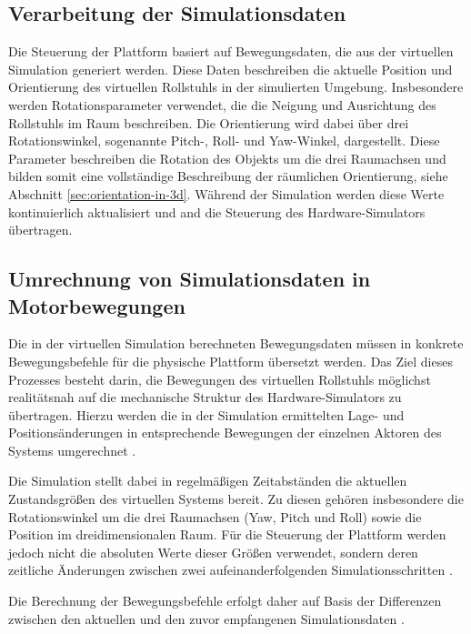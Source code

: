 \subsection{Verarbeitung der Simulationsdaten}
Die Steuerung der Plattform basiert auf Bewegungsdaten, die aus der virtuellen Simulation generiert werden. Diese Daten beschreiben die aktuelle Position und Orientierung des virtuellen Rollstuhls in der simulierten Umgebung. Insbesondere werden Rotationsparameter verwendet, die die Neigung und Ausrichtung des Rollstuhls im Raum beschreiben. Die Orientierung wird dabei über drei Rotationswinkel, sogenannte Pitch-, Roll- und Yaw-Winkel, dargestellt. Diese Parameter beschreiben die Rotation des Objekts um die drei Raumachsen und bilden somit eine vollständige Beschreibung der räumlichen Orientierung, siehe Abschnitt \ref{sec:orientation-in-3d}.
Während der Simulation werden diese Werte kontinuierlich aktualisiert und and die Steuerung des Hardware-Simulators übertragen.

\subsection{Umrechnung von Simulationsdaten in Motorbewegungen}
Die in der virtuellen Simulation berechneten Bewegungsdaten müssen in konkrete Bewegungsbefehle für die physische Plattform übersetzt werden. Das Ziel dieses Prozesses besteht darin, die Bewegungen des virtuellen Rollstuhls möglichst realitätsnah auf die mechanische Struktur des Hardware-Simulators zu übertragen. Hierzu werden die in der Simulation ermittelten Lage- und Positionsänderungen in entsprechende Bewegungen der einzelnen Aktoren des Systems umgerechnet \cite{Astrom2021}.

Die Simulation stellt dabei in regelmäßigen Zeitabständen die aktuellen Zustandsgrößen des virtuellen Systems bereit. Zu diesen gehören insbesondere die Rotationswinkel um die drei Raumachsen (Yaw, Pitch und Roll) sowie die Position im dreidimensionalen Raum. Für die Steuerung der Plattform werden jedoch nicht die absoluten Werte dieser Größen verwendet, sondern deren zeitliche Änderungen zwischen zwei aufeinanderfolgenden Simulationsschritten \cite{Astrom2021}.

Die Berechnung der Bewegungsbefehle erfolgt daher auf Basis der Differenzen zwischen den aktuellen und den zuvor empfangenen Simulationsdaten \cite{Astrom2021}.

